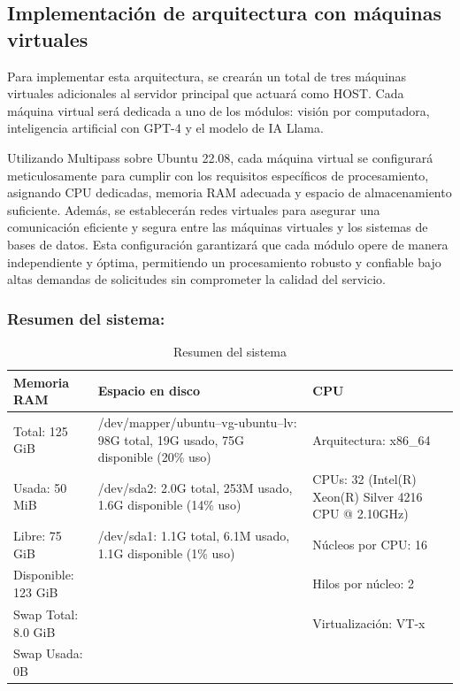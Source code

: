 \subsection*{Implementación de arquitectura con máquinas virtuales}

Para implementar esta arquitectura, se crearán un total de tres máquinas virtuales adicionales al servidor principal que actuará como HOST. Cada máquina virtual será dedicada a uno de los módulos: visión por computadora, inteligencia artificial con GPT-4 y el modelo de IA Llama.

Utilizando Multipass sobre Ubuntu 22.08, cada máquina virtual se configurará meticulosamente para cumplir con los requisitos específicos de procesamiento, asignando CPU dedicadas, memoria RAM adecuada y espacio de almacenamiento suficiente. Además, se establecerán redes virtuales para asegurar una comunicación eficiente y segura entre las máquinas virtuales y los sistemas de bases de datos. Esta configuración garantizará que cada módulo opere de manera independiente y óptima, permitiendo un procesamiento robusto y confiable bajo altas demandas de solicitudes sin comprometer la calidad del servicio.

\subsubsection*{Resumen del sistema:}

\renewcommand{\arraystretch}{1.3} %
\begin{table}[H]
\centering
\begin{tabularx}{\textwidth}{|m{4cm}|m{6cm}|m{4cm}|}
\hline
\textbf{Memoria RAM} & \textbf{Espacio en disco} & \textbf{CPU} \\ \hline
Total: 125 GiB & /dev/mapper/ubuntu--vg-ubuntu--lv: 98G total, 19G usado, 75G disponible (20\% uso) & Arquitectura: x86\_64 \\ \hline
Usada: 50 MiB & /dev/sda2: 2.0G total, 253M usado, 1.6G disponible (14\% uso) & CPUs: 32 (Intel(R) Xeon(R) Silver 4216 CPU @ 2.10GHz) \\ \hline
Libre: 75 GiB & /dev/sda1: 1.1G total, 6.1M usado, 1.1G disponible (1\% uso) & Núcleos por CPU: 16 \\ \hline
Disponible: 123 GiB & & Hilos por núcleo: 2 \\ \hline
Swap Total: 8.0 GiB & & Virtualización: VT-x \\ \hline
Swap Usada: 0B & & \\ \hline
\end{tabularx}
\caption{Resumen del sistema}
\label{tab:system_summary}
\end{table}

